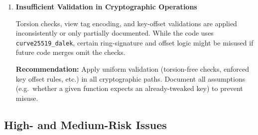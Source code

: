 \documentclass[12pt,a4paper]{article}
\begin{document}
\begin{enumerate}
    \item \textbf{Insufficient Validation in Cryptographic Operations}

    Torsion checks, view tag encoding, and key-offset validations are applied inconsistently or only partially documented. While the code uses \texttt{curve25519\_dalek}, certain ring-signature and offset logic might be misused if future code merges omit the checks.

    \textbf{Recommendation:}
    Apply uniform validation (torsion-free checks, enforced key offset rules, etc.) in all cryptographic paths. Document all assumptions (e.g.\ whether a given function expects an already-tweaked key) to prevent misuse.

\end{enumerate}

\subsection{High- and Medium-Risk Issues}
\end{document}
